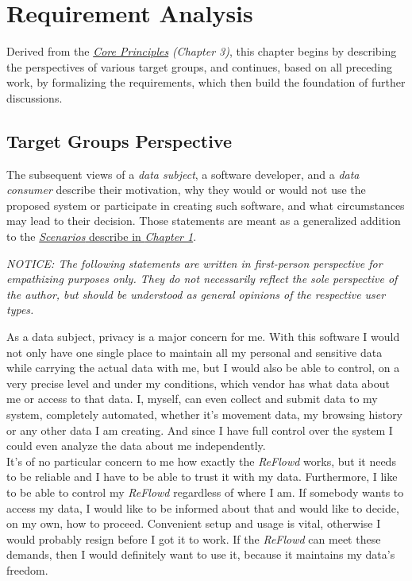 \documentclass[12pt,english,a4paper,titlepage,cleardoublepage=empty,dottedtoc]{report}
\begin{document}
\chapter{Requirement Analysis}\label{requirement-analysis}

Derived from the \emph{\protect\hyperlink{core-principles}{Core
Principles}} \emph{(Chapter 3)}, this chapter begins by describing the
perspectives of various target groups, and continues, based on all
preceding work, by formalizing the requirements, which then build the
foundation of further discussions.

\hypertarget{target-groups-perspective}{\section{Target Groups
Perspective}\label{target-groups-perspective}}

The subsequent views of a \emph{data subject}, a software developer, and
a \emph{data consumer} describe their motivation, why they would or
would not use the proposed system or participate in creating such
software, and what circumstances may lead to their decision. Those
statements are meant as a generalized addition to the
\protect\hyperlink{scenarios}{\emph{Scenarios} describe in \emph{Chapter
1}}.

\emph{NOTICE: The following statements are written in first-person
perspective for empathizing purposes only. They do not necessarily
reflect the sole perspective of the author, but should be understood as
general opinions of the respective user types.}

As a data subject, privacy is a major concern for me. With this software
I would not only have one single place to maintain all my personal and
sensitive data while carrying the actual data with me, but I would also
be able to control, on a very precise level and under my conditions,
which vendor has what data about me or access to that data. I, myself,
can even collect and submit data to my system, completely automated,
whether it's movement data, my browsing history or any other data I am
creating. And since I have full control over the system I could even
analyze the data about me independently.\\
It's of no particular concern to me how exactly the \emph{ReFlowd}
works, but it needs to be reliable and I have to be able to trust it
with my data. Furthermore, I like to be able to control my
\emph{ReFlowd} regardless of where I am. If somebody wants to access my
data, I would like to be informed about that and would like to decide,
on my own, how to proceed. Convenient setup and usage is vital,
otherwise I would probably resign before I got it to work. If the
\emph{ReFlowd} can meet these demands, then I would definitely want to
use it, because it maintains my data's freedom.
\end{document}
